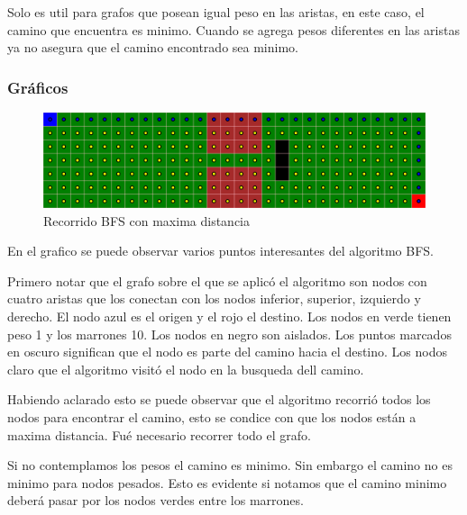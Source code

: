 Solo es util para grafos que posean igual peso en las aristas, en este caso, el camino que encuentra es minimo. Cuando se agrega pesos diferentes en las aristas ya no asegura que el camino encontrado sea minimo.


\subsubsection{Gráficos}
\begin{figure}[h]
\centering
\includegraphics[width=\textwidth]{Graphics/BFSSample.png}
\caption{Recorrido BFS con maxima distancia}
\end{figure}
En el grafico se puede observar varios puntos interesantes del algoritmo BFS. 

Primero notar que el grafo sobre el que se aplicó el algoritmo son nodos con cuatro aristas que los conectan con los nodos inferior, superior, izquierdo y derecho. El nodo azul es el origen y el rojo el destino. Los nodos en verde tienen peso 1 y los marrones 10. Los nodos en negro son aislados. 
Los puntos marcados en oscuro significan que el nodo es parte del camino hacia el destino. Los nodos claro que el algoritmo visitó el nodo en la busqueda dell camino.

Habiendo aclarado esto se puede observar que el algoritmo recorrió todos los nodos para encontrar el camino, esto se condice con que los nodos están a maxima distancia. Fué necesario recorrer todo el grafo. 

Si no contemplamos los pesos el camino es minimo. Sin embargo el camino no es minimo para nodos pesados. Esto es evidente si notamos que el camino minimo deberá pasar por los nodos verdes entre los marrones. 

